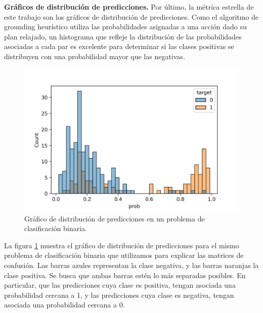 \textbf{Gráficos de distribución de predicciones.} Por último, la métrica
estrella de este trabajo son los gráficos de distribución de predicciones. Como
el algoritmo de grounding heurístico utiliza las probabilidades asignadas a una
acción dado su plan relajado, un histograma que refleje la distribución de las
probabilidades asociadas a cada par es excelente para determinar si las clases
positivas se distribuyen con una probabilidad mayor que las negativas.

\begin{figure}[h!]
    \centering
    \includegraphics[width=0.7\linewidth]{figures/displot_example.png}
    \caption{Gráfico de distribución de predicciones en un problema de clasificación binaria.}
    \label{fig:distplot-example}
\end{figure}

La figura \ref{fig:distplot-example} muestra el gráfico de distribución de
predicciones para el mismo problema de clasificación binaria que utilizamos para
explicar las matrices de confusión. Las barras azules representan la clase
negativa, y las barras naranjas la clase positiva. Se busca que ambas barras
estén lo más separadas posibles. En particular, que las predicciones cuya clase
es positiva, tengan asociada una probabilidad cercana a 1, y las predicciones
cuya clase es negativa, tengan asociada una probabilidad cercana a 0.